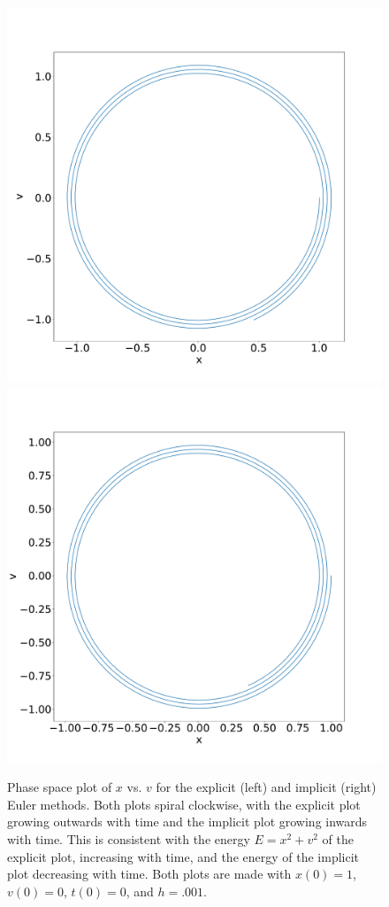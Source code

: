 \documentclass[11pt, oneside]{article}   	%
\begin{document}
\begin{section}
\begin{figure}[H]
\includegraphics[width=.5\textwidth, height=.35\textheight]{XvsVexplicit.pdf}
\includegraphics[width=.5\textwidth, height=.35\textheight]{XvsVimplicit.pdf}
\caption{Phase space plot of $x$ vs. $v$ for the explicit (left) and implicit (right) Euler methods. Both plots spiral clockwise, with the explicit plot growing outwards with time and the implicit plot growing inwards with time. This is consistent with the energy $E = x^2 + v^2$ of the explicit plot, increasing with time, and the energy of the implicit plot decreasing with time. Both plots are made with $x(0) = 1$, $v(0) = 0$, $t(0) = 0$, and $h = .001$.}
\end{figure}


\end{section}
\end{document}
